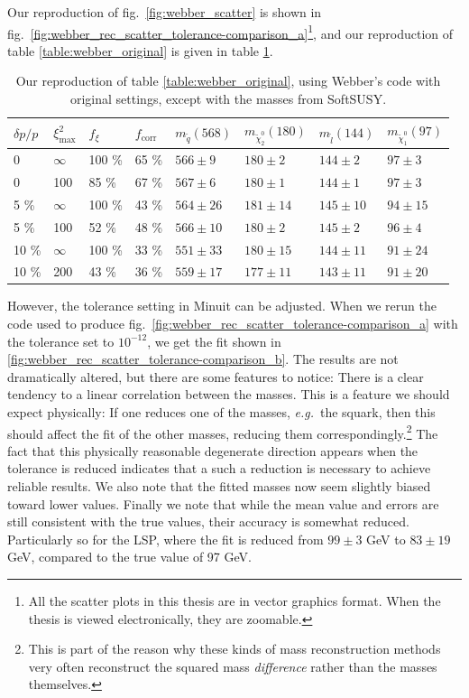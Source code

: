 \documentclass[twoside,english]{uiofysmaster}
\begin{document}
Our reproduction of fig.\ \ref{fig:webber_scatter} is shown in fig.\ \ref{fig:webber_rec_scatter_tolerance-comparison_a}\footnote{All the scatter plots in this thesis are in vector graphics format. When the thesis is viewed electronically, they are zoomable.}, and our reproduction of table \ref{table:webber_original} is given in table \ref{table:webber_softsusy}.
\begin{table}[hbt]
	\centering
	\begin{tabular}{| l | l | l | l  || l | l | l | l |}
		\hline
		$\delta p/p$ & $\xi^2_\mathrm{max}$ & $f_\xi$ & $f_\mathrm{corr}$ & $m_{\tilde q} (568)$ & $m_{\tilde \chi_2^0} (180)$ & $m_{\tilde l} (144)$ & $m_{\tilde \chi_1^0} (97)$ \\
		\hline \hline
		0 & 	$\infty$ &	100 \%	& 65 \%	& $566 \pm 9$	&	$180 \pm 2$		&	$144 \pm 2$	& 	$97 \pm 3$	\\
		0 &		100 &		85 \%	& 67 \% & $567 \pm 6$	&	$180 \pm 1$		&	$144 \pm 1$	&	$97 \pm 3$	\\
		5 \% &	$\infty$ &	100 \%	& 43 \% & $564 \pm 26$	& 	$181 \pm 14$	&	$145 \pm 10$&	$94 \pm 15$ \\
		5 \% &	100 &		52 \%	& 48 \% & $566 \pm 10$	&	$180 \pm 2$		& 	$145 \pm 2$	&	$96 \pm 4$	\\
		10 \% &	$\infty$ &	100 \%	& 33 \% & $551 \pm 33$	&	$180 \pm 15$	&	$144 \pm 11$&	$91 \pm 24$	\\
			10 \% &	200 &		43 \%	& 36 \% & $559 \pm 17$	& 	$177 \pm 11$	&	$143 \pm 11$&	$91 \pm 20$ \\
		\hline
	\end{tabular}
	\caption{Our reproduction of table \ref{table:webber_original}, using Webber's code \cite{Webber:epost} with original settings, except with the masses from SoftSUSY.}
	\label{table:webber_softsusy}
\end{table}

However, the tolerance setting in {Minuit} can be adjusted. When we rerun the code used to produce fig.\ \ref{fig:webber_rec_scatter_tolerance-comparison_a} with the tolerance set to $10^{-12}$, we get the fit shown in \ref{fig:webber_rec_scatter_tolerance-comparison_b}. The results are not dramatically altered, but there are some features to notice: There is a clear tendency to a linear correlation between the masses. This is a feature we should expect physically: If one reduces one of the masses, {\it e.g.}\ the squark, then this should affect the fit of the other masses, reducing them correspondingly.\footnote{This is part of the reason why these kinds of mass reconstruction methods very often reconstruct the squared mass {\it difference} rather than the masses themselves.} The fact that this physically reasonable degenerate direction appears when the tolerance is reduced indicates that a such a reduction is necessary to achieve reliable results. We also note that the fitted masses now seem slightly biased toward lower values. Finally we note that while the mean value and errors are still consistent with the true values, their accuracy is somewhat reduced. Particularly so for the LSP, where the fit is reduced from $99 \pm 3$ GeV to $83 \pm 19$ GeV, compared to the true value of 97 GeV.
\end{document}
